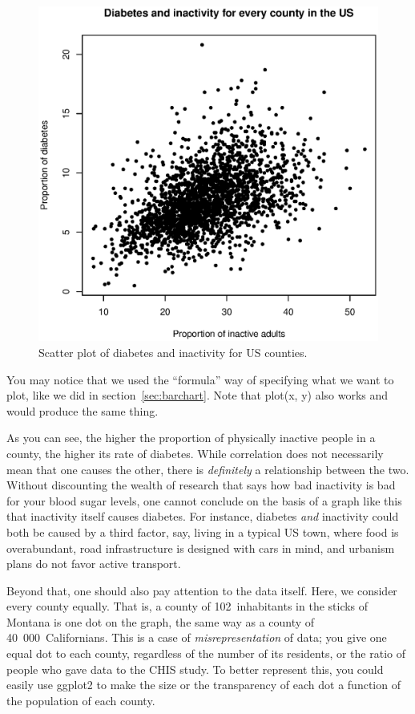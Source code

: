 \documentclass{report}
\newcommand{\code}[1]{\textsf{\ttfamily #1}}
\begin{document}
	\begin{figure}[h]
		\centering
		\includegraphics[width=1.0\textwidth]{scatter.eps}
		\caption{Scatter plot of diabetes and inactivity for US counties.}
		\label{fig:scatter}
	\end{figure}

	You may notice that we used the ``formula'' way of specifying what we want to plot, like we did in section~\ref{sec:barchart}. Note that \code{plot(x, y)} also works and would produce the same thing.
	
	As you can see, the higher the proportion of physically inactive people in a county, the higher its rate of diabetes. While correlation does not necessarily mean that one causes the other, there is \emph{definitely} a relationship between the two. Without discounting the wealth of research that says how bad inactivity is bad for your blood sugar levels, one cannot conclude on the basis of a graph like this that inactivity itself causes diabetes. For instance, diabetes \emph{and} inactivity could both be caused by a third factor, say, living in a typical US town, where food is overabundant, road infrastructure is designed with cars in mind, and urbanism plans do not favor active transport.
	
	Beyond that, one should also pay attention to the data itself. Here, we consider every county equally. That is, a county of 102~inhabitants in the sticks of Montana is one dot on the graph, the same way as a county of 40~000~Californians. This is a case of \emph{misrepresentation} of data; you give one equal dot to each county, regardless of the number of its residents, or the ratio of people who gave data to the CHIS study. To better represent this, you could easily use \code{ggplot2} to make the size or the transparency of each dot a function of the population of each county.
	
\end{document}
